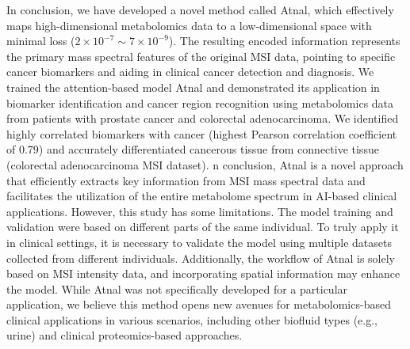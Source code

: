 \documentclass[journal=jacsat,manuscript=article]{achemso}
\begin{document}
In conclusion, we have developed a novel method called Atnal, which effectively maps 
high-dimensional metabolomics data to a low-dimensional space with minimal 
loss ($2 \times 10^{-7} \sim 7 \times 10^{-9}$). The resulting encoded information represents the primary mass 
spectral features of the original MSI data, pointing to specific cancer biomarkers 
and aiding in clinical cancer detection and diagnosis. We trained the attention-based 
model Atnal and demonstrated its application in biomarker identification and cancer 
region recognition using metabolomics data from patients with prostate cancer and 
colorectal adenocarcinoma. We identified highly correlated biomarkers with cancer 
(highest Pearson correlation coefficient of 0.79) and accurately differentiated 
cancerous tissue from connective tissue (colorectal adenocarcinoma MSI dataset). 
n conclusion, Atnal is a novel approach that efficiently extracts key information 
from MSI mass spectral data and facilitates the utilization of the entire metabolome 
spectrum in AI-based clinical applications. However, this study has some limitations. 
The model training and validation were based on different parts of the same individual. 
To truly apply it in clinical settings, it is necessary to validate the model using 
multiple datasets collected from different individuals. Additionally, the workflow of 
Atnal is solely based on MSI intensity data, and incorporating spatial information may 
enhance the model. While Atnal was not specifically developed for a particular 
application, we believe this method opens new avenues for metabolomics-based clinical 
applications in various scenarios, including 
other biofluid types (e.g., urine) and clinical proteomics-based approaches.
\end{document}
